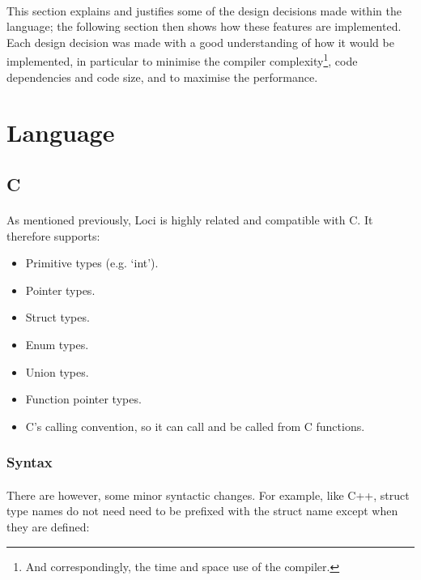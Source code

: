 \documentclass[12pt,twoside,notitlepage]{report}
\begin{document}
\paragraph{}
This section explains and justifies some of the design decisions made within the language; the following section then shows how these features are implemented. Each design decision was made with a good understanding of how it would be implemented, in particular to minimise the compiler complexity\footnote{And correspondingly, the time and space use of the compiler.}, code dependencies and code size, and to maximise the performance.

\section{Language}

\subsection{C}

\paragraph{}
As mentioned previously, Loci is highly related and compatible with C. It therefore supports:

\begin{itemize}
\item Primitive types (e.g. `int').
\item Pointer types.
\item Struct types.
\item Enum types.
\item Union types.
\item Function pointer types.
\item C's calling convention, so it can call and be called from C functions.
\end{itemize}

\subsubsection{Syntax}

\paragraph{}
There are however, some minor syntactic changes. For example, like C++, struct type names do not need need to be prefixed with the struct name except when they are defined:
\end{document}
